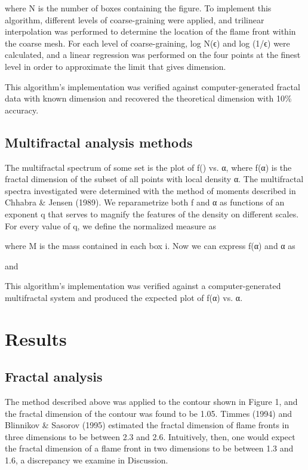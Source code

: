 \documentclass[iop]{emulateapj}
\begin{document}
where N is the number of boxes containing the figure.  To implement this algorithm, different levels of coarse-graining were applied, and trilinear interpolation was performed to determine the location of the flame front within the coarse mesh. For each level of coarse-graining, log N(ϵ) and log (1/ϵ) were calculated, and a linear regression was performed on the four points at the finest level in order to approximate the limit that gives dimension.

This algorithm’s implementation was verified against computer-generated fractal data with known dimension and recovered the theoretical dimension with 10\% accuracy.

\subsection{Multifractal analysis methods}\label{MultifractalMethods}
The multifractal spectrum of some set is the plot of f(\alpha) vs. α, where f(α) is the fractal dimension of the subset of all points with local density α. The multifractal spectra investigated were determined with the method of moments described in Chhabra & Jensen (1989). We reparametrize both f and α as functions of an exponent q that serves to magnify the features of the density on different scales. For every value of q, we define the normalized measure as

where M is the mass contained in each box i. Now we can express f(α) and α as

and

This algorithm’s implementation was verified against a computer-generated multifractal system and produced the expected plot of f(α) vs. α.

\section{Results}\label{Results}

\subsection{Fractal analysis}\label{FractalResults}
The method described above was applied to the contour shown in Figure 1, and the fractal dimension of the contour was found to be 1.05. Timmes (1994) and Blinnikov & Sasorov (1995) estimated the fractal dimension of flame fronts in three dimensions to be between 2.3 and 2.6. Intuitively, then, one would expect the fractal dimension of a flame front in two dimensions to be between 1.3 and 1.6, a discrepancy we examine in Discussion.
\end{document}
